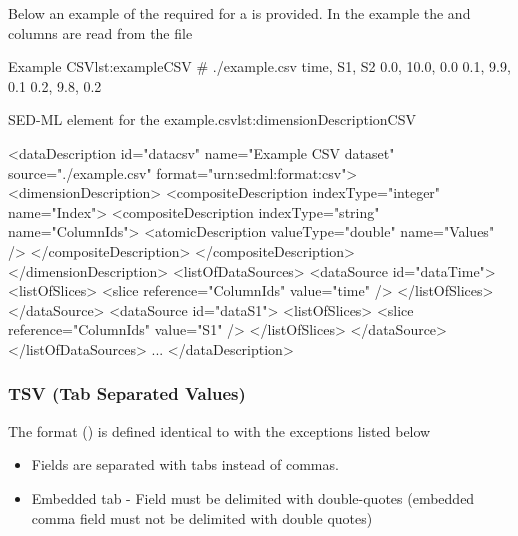 Below an example of the required \hyperref[sec:dimensionDescription]{} for a  is provided. In the example the  and  columns are read from the  file
\begin{myXmlLst}{Example CSV}{lst:exampleCSV}
# ./example.csv
time, S1, S2
0.0, 10.0, 0.0
0.1, 9.9, 0.1
0.2, 9.8, 0.2
\end{myXmlLst}

\begin{myXmlLst}{SED-ML  element for the example.csv}{lst:dimensionDescriptionCSV}

<dataDescription id="datacsv" name="Example CSV dataset" source="./example.csv" format="urn:sedml:format:csv">
  <dimensionDescription>
    <compositeDescription indexType="integer" name="Index">
      <compositeDescription indexType="string" name="ColumnIds">
        <atomicDescription valueType="double" name="Values" />
      </compositeDescription>
    </compositeDescription>
  </dimensionDescription>
  <listOfDataSources>
    <dataSource id="dataTime">
      <listOfSlices>
        <slice reference="ColumnIds" value="time" />
      </listOfSlices>
    </dataSource>
    <dataSource id="dataS1">
      <listOfSlices>
        <slice reference="ColumnIds" value="S1" />
      </listOfSlices>
    </dataSource>
  </listOfDataSources>
  ...          
</dataDescription>
\end{myXmlLst} 

\subsubsection{TSV (Tab Separated Values)}
\label{sec:dataFormatTSV}
The format  () is defined identical to \hyperref[sec:dataFormatCSV]{} with the exceptions listed below
\begin{itemize}
    \item Fields are separated with tabs instead of commas.
    \item Embedded tab - Field must be delimited with double-quotes (embedded comma field must not be delimited with double quotes)
\end{itemize}


